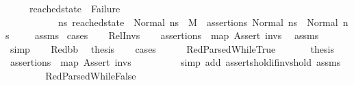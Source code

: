 \begin{isabellebody}
\ \ \ \ \ {\isachardoublequoteopen}reached{\isacharunderscore}{\kern0pt}state\ {\isasymnoteq}\ Failure\ \ {\isasymand}\isanewline
\ \ \ \ \ \ \ \ \ \ \ {\isacharparenleft}{\kern0pt}{\isasymforall}ns{}{\isacharprime}{\kern0pt}{\isachardot}{\kern0pt}\ reached{\isacharunderscore}{\kern0pt}state\ {\isacharequal}{\kern0pt}\ Normal\ ns{}{\isacharprime}{\kern0pt}\ {\isasymlongrightarrow}\ {\isacharparenleft}{\kern0pt}M{\isacharcomma}{\kern0pt}{\isasymLambda}{\isacharcomma}{\kern0pt}{\isasymGamma}{\isacharcomma}{\kern0pt}{\isasymOmega}\ {\isasymturnstile}\ {\isasymlangle}assertions{\isacharcomma}{\kern0pt}\ Normal\ ns{}{\isasymrangle}\ {\isacharbrackleft}{\kern0pt}{\isasymrightarrow}{\isacharbrackright}{\kern0pt}\ Normal\ ns{}{\isacharprime}{\kern0pt}{\isacharparenright}{\kern0pt}{\isacharparenright}{\kern0pt}{\isachardoublequoteclose}\ \isanewline
%
\isadelimproof
\ \ %
\endisadelimproof
%
\isatagproof
{}\isamarkupfalse%
\ assms\isanewline
{}\isamarkupfalse%
\ cases\isanewline
\ \ \isamarkupfalse%
\ Rel{\isacharunderscore}{\kern0pt}Invs\isanewline
\ \ \isamarkupfalse%
\ {\isachardoublequoteopen}assertions\ {\isacharequal}{\kern0pt}\ map\ Assert\ invs{\isachardoublequoteclose}\ \isamarkupfalse%
\ assms{\isacharparenleft}{\kern0pt}{}{\isacharparenright}{\kern0pt}\ \isamarkupfalse%
\ simp\isanewline
\ \ \isamarkupfalse%
\ Red{\isacharunderscore}{\kern0pt}bb\ \isamarkupfalse%
\ {\isacharquery}{\kern0pt}thesis\isanewline
\ \ \isamarkupfalse%
\ cases\isanewline
\ \ \ \ \isamarkupfalse%
\ RedParsedWhileTrue\ \isanewline
\ \ \ \ \isamarkupfalse%
\ {\isacharquery}{\kern0pt}thesis\ \isamarkupfalse%
\ {\isacartoucheopen}assertions\ {\isacharequal}{\kern0pt}\ {\isacharparenleft}{\kern0pt}map\ Assert\ invs{\isacharparenright}{\kern0pt}{\isacartoucheclose}\ \ \isanewline
\ \ \ \ \ \ \isamarkupfalse%
\ {\isacharparenleft}{\kern0pt}simp\ add{\isacharcolon}{\kern0pt}\ asserts{\isacharunderscore}{\kern0pt}hold{\isacharunderscore}{\kern0pt}if{\isacharunderscore}{\kern0pt}invs{\isacharunderscore}{\kern0pt}hold\ assms{\isacharparenleft}{\kern0pt}{}{\isacharparenright}{\kern0pt}{\isacharparenright}{\kern0pt}\isanewline
\ \ \isamarkupfalse%
\isanewline
\ \ \ \ \isamarkupfalse%
\ RedParsedWhileFalse\ \isanewline

\end{isabellebody}
